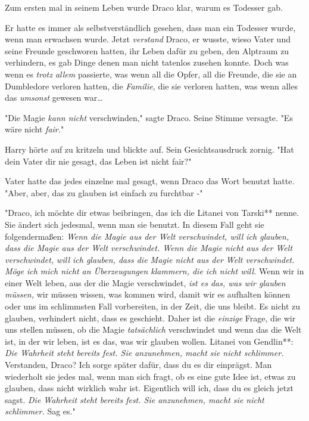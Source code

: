 {Zum ersten mal in seinem Leben wurde Draco klar, warum es Todesser gab.

Er hatte es immer als selbstverständlich gesehen, dass man ein Todesser wurde, wenn man erwachsen wurde. Jetzt \emph{verstand} Draco, er wusste, wieso Vater und seine Freunde geschworen hatten, ihr Leben dafür zu geben, den Alptraum zu verhindern, es gab Dinge denen man nicht tatenlos zusehen konnte. Doch was wenn es \emph{trotz allem} passierte, was wenn all die Opfer, all die Freunde, die sie an Dumbledore verloren hatten, die \emph{Familie,} die sie verloren hatten, was wenn alles das \emph{umsonst} gewesen war…

"Die Magie \emph{kann nicht} verschwinden," sagte Draco. Seine Stimme versagte. "Es wäre nicht \emph{fair.}"

Harry hörte auf zu kritzeln und blickte auf. Sein Gesichtsausdruck zornig. "Hat dein Vater dir nie gesagt, das Leben ist nicht fair?"

Vater hatte das jedes einzelne mal gesagt, wenn Draco das Wort benutzt hatte. "Aber, aber, das zu glauben ist einfach zu furchtbar -"

"Draco, ich möchte dir etwas beibringen, das ich die Litanei von Tarski** nenne. Sie ändert sich jedesmal, wenn man sie benutzt. In diesem Fall geht sie folgendermaßen: \emph{Wenn die Magie aus der Welt verschwindet, will ich glauben, dass die Magie aus der Welt verschwindet. Wenn die Magie nicht aus der Welt verschwindet, will ich glauben, dass die Magie nicht aus der Welt verschwindet. Möge ich mich nicht an Überzeugungen klammern, die ich nicht will.} Wenn wir in einer Welt leben, aus der die Magie verschwindet, \emph{ist es das, was wir glauben müssen,} wir müssen wissen, was kommen wird, damit wir es aufhalten können oder uns im schlimmsten Fall vorbereiten, in der Zeit, die uns bleibt. Es nicht zu glauben, verhindert nicht, dass es geschieht. Daher ist die \emph{einzige} Frage, die wir uns stellen müssen, ob die Magie \emph{tatsächlich} verschwindet und wenn das die Welt ist, in der wir leben, ist es das, was wir glauben wollen. Litanei von Gendlin**: \emph{Die Wahrheit steht bereits fest. Sie anzunehmen, macht sie nicht schlimmer.} Verstanden, Draco? Ich sorge später dafür, dass du es dir einprägst. Man wiederholt sie jedes mal, wenn man sich fragt, ob es eine gute Idee ist, etwas zu glauben, dass nicht wirklich wahr ist. Eigentlich will ich, dass du es gleich jetzt sagst. \emph{Die Wahrheit steht bereits fest. Sie anzunehmen, macht sie nicht schlimmer.} Sag es."

}
